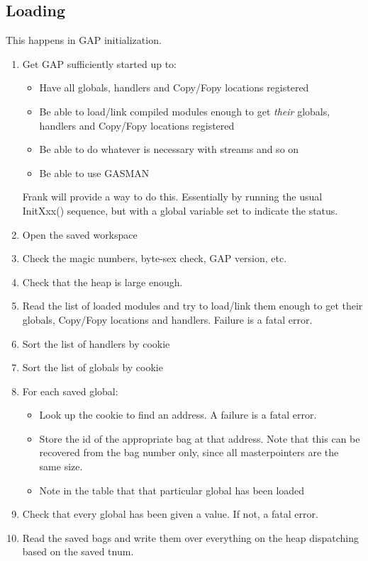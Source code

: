 \documentclass[11pt]{article}
\begin{document}
\subsection{Loading}

This happens in GAP initialization. 

\begin{enumerate}
\item Get GAP sufficiently started up to:
\begin{itemize}
\item Have all globals, handlers and Copy/Fopy locations registered
\item Be able to load/link compiled modules enough to get \emph{their}
globals, handlers and Copy/Fopy locations registered
\item Be able to do whatever is necessary with streams and so on
\item Be able to use GASMAN
\end{itemize}
Frank will provide a way to do this. Essentially by running the usual
InitXxx() sequence, but with a global variable set to indicate the
status.
\item Open the saved workspace
\item Check the magic numbers, byte-sex check, GAP version, etc.
\item Check that the heap is large enough. 
\item Read the list of loaded modules and try to load/link them enough
to get their globals, Copy/Fopy locations and handlers. Failure is
a fatal error. 
\item Sort the list of handlers by cookie
\item Sort the list of globals by cookie
\item For each saved global:
\begin{itemize}
\item Look up the cookie to find an address. A failure is a fatal error.
\item Store the id of the appropriate bag at that address. Note that
this can be recovered from the bag number only, since all
masterpointers are the same size.
\item Note in the table that that particular global has been loaded
\end{itemize}
\item Check that every global has been given a value. If not, a fatal error.
\item Read the saved bags and write them over everything on the heap
dispatching based on the saved tnum.

\end{enumerate}
\end{document}
